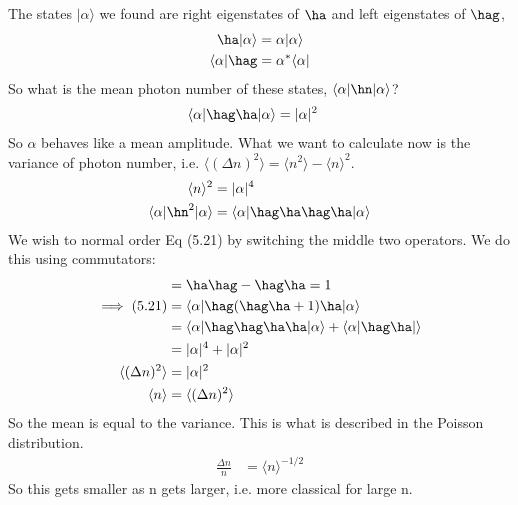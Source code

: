 \documentclass[a4paper, 11pt, normalem]{report}
\begin{document}
The states $|\alpha\rangle$ we found are right eigenstates of $\ha$ and left eigenstates of $\hag$,
\begin{align}
    \ha|\alpha\rangle &= \alpha|\alpha\rangle \\
    \langle\alpha|\hag &= \alpha^*\langle\alpha|
\end{align}
So what is the mean photon number of these states, $\langle\alpha|\hn|\alpha\rangle$?
\begin{align}
    \langle\alpha|\hag\ha|\alpha\rangle &= |\alpha|^2
\end{align}
So $\alpha$ behaves like a mean amplitude.
What we want to calculate now is the variance of photon number, i.e. $\langle(\Delta n)^2\rangle = \langle n^2\rangle - \langle n\rangle^2$.
\begin{align}
    \langle n\rangle^2 &= |\alpha|^4 \\
    \langle\alpha|\hn^2|\alpha\rangle &= \langle\alpha|\hag\ha\hag\ha|\alpha\rangle
\end{align}
We wish to normal order Eq (5.21) by switching the middle two operators. 
We do this using commutators:
\begin{align}
    [\ha,\hag] &= \ha\hag - \hag\ha = 1 \\ 
    \implies (5.21) &= \langle\alpha|\hag(\hag\ha + 1)\ha|\alpha\rangle \\
                    &= \langle\alpha|\hag\hag\ha\ha|\alpha\rangle + \langle\alpha|\hag\ha|\rangle \\
                    &= |\alpha|^4 + |\alpha|^2 \\
    \langle(\Delta n)^2\rangle &= |\alpha|^2 \\
    \langle n\rangle &= \langle(\Delta n)^2\rangle
\end{align}
So the mean is equal to the variance. 
This is what is described in the Poisson distribution.
\begin{align}
    \frac{\Delta n}{n} &= \langle n\rangle^{-1/2}
\end{align}
So this gets smaller as n gets larger, i.e. more classical for large n. 
\end{document}
